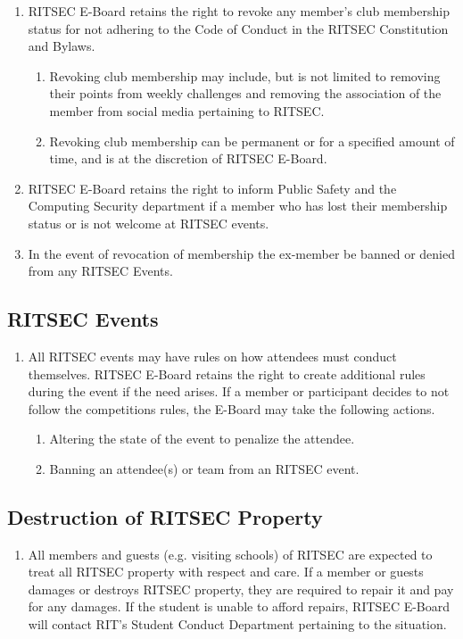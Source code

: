 \begin{enumerate}
  \item RITSEC E-Board retains the right to revoke any member’s club membership
    status for not adhering to the Code of Conduct in the RITSEC Constitution
    and Bylaws. 
  \begin{enumerate}
    \item Revoking club membership may include, but is not limited to removing
      their points from weekly challenges and removing the association of the
      member from social media pertaining to RITSEC.
    \item Revoking club membership can be permanent or for a specified amount
      of time, and is at the discretion of RITSEC E-Board.
  \end{enumerate}
  \item RITSEC E-Board retains the right to inform Public Safety and the
    Computing Security department if a member who has lost their membership
    status or is not welcome at RITSEC events.
  \item In the event of revocation of membership the ex-member be banned or
    denied from any RITSEC Events.
\end{enumerate}

\subsection{RITSEC Events}

\begin{enumerate}
  \item All RITSEC events may have rules on how attendees must conduct
    themselves. RITSEC E-Board retains the right to create additional rules
    during the event if the need arises. If a member or participant decides to
    not follow the competitions rules, the E-Board may take the following
    actions. 
  \begin{enumerate}
    \item Altering the state of the event to penalize the attendee.
    \item Banning an attendee(s) or team from an RITSEC event.
  \end{enumerate}
\end{enumerate}

\subsection{Destruction of RITSEC Property}

\begin{enumerate}
  \item All members and guests (e.g. visiting schools) of RITSEC are expected
    to treat all RITSEC property with respect and care. If a member or guests
    damages or destroys RITSEC property, they are required to repair it and pay
    for any damages. If the student is unable to afford repairs, RITSEC E-Board
    will contact RIT’s Student Conduct Department pertaining to the situation.
\end{enumerate}